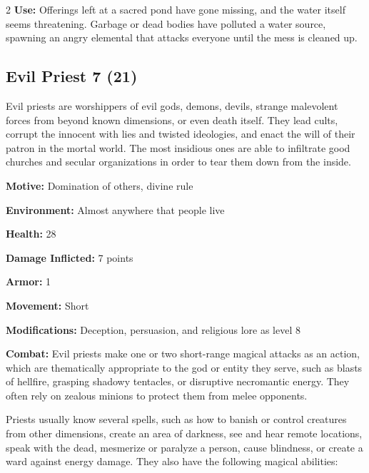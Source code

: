 \begin{multicols}{2}
\textbf{Use:} Offerings left at a sacred pond have gone missing, and the water itself seems threatening. Garbage or dead bodies have polluted a water source, spawning an angry elemental that attacks everyone until the mess is cleaned up.

\subsection{Evil Priest 7 (21)}


Evil priests are worshippers of evil gods, demons, devils, strange malevolent forces from beyond known dimensions, or even death itself. They lead cults, corrupt the innocent with lies and twisted ideologies, and enact the will of their patron in the mortal world. The most insidious ones are able to infiltrate good churches and secular organizations in order to tear them down from the inside. 

\textbf{Motive:} Domination of others, divine rule 

\textbf{Environment:} Almost anywhere that people live 

\textbf{Health:} 28 

\textbf{Damage Inflicted:} 7 points 

\textbf{Armor:} 1 

\textbf{Movement:} Short 

\textbf{Modifications:} Deception, persuasion, and religious lore as level 8 

\textbf{Combat:} Evil priests make one or two short-range magical attacks as an action, which are thematically appropriate to the god or entity they serve, such as blasts of hellfire, grasping shadowy tentacles, or disruptive necromantic energy. They often rely on zealous minions to protect them from melee opponents. 

Priests usually know several spells, such as how to banish or control creatures from other dimensions, create an area of darkness, see and hear remote locations, speak with the dead, mesmerize or paralyze a person, cause blindness, or create a ward against energy damage. They also have the following magical abilities: 


\end{multicols}
